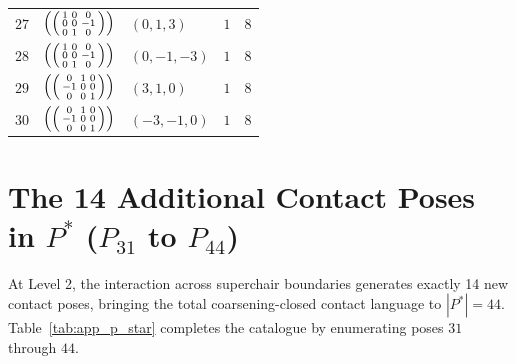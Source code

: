 \documentclass[11pt,a4paper]{article}
\theoremstyle{definition}
\begin{document}
\begin{longtable}{p{1.2cm}p{3.0cm}p{2.6cm}cc}
$27$ & $\left(\begin{psmallmatrix} 1 & 0 & 0 \\ 0 & 0 & -1 \\ 0 & 1 & 0 \end{psmallmatrix}\right)$ & $(0, 1, 3)$ & $1$ & $8$ \\
$28$ & $\left(\begin{psmallmatrix} 1 & 0 & 0 \\ 0 & 0 & -1 \\ 0 & 1 & 0 \end{psmallmatrix}\right)$ & $(0, -1, -3)$ & $1$ & $8$ \\
$29$ & $\left(\begin{psmallmatrix} 0 & 1 & 0 \\ -1 & 0 & 0 \\ 0 & 0 & 1 \end{psmallmatrix}\right)$ & $(3, 1, 0)$ & $1$ & $8$ \\
$30$ & $\left(\begin{psmallmatrix} 0 & 1 & 0 \\ -1 & 0 & 0 \\ 0 & 0 & 1 \end{psmallmatrix}\right)$ & $(-3, -1, 0)$ & $1$ & $8$ \\
\bottomrule
\end{longtable}

\section{The 14 Additional Contact Poses in $P^*$ ($P_{31}$ to $P_{44}$)}
\label{app:p_star_contacts}

At Level 2, the interaction across superchair boundaries generates exactly 14 new contact poses, bringing the total coarsening-closed contact language to $|P^*| = 44$. Table~\ref{tab:app_p_star} completes the catalogue by enumerating poses $31$ through $44$.
\end{document}
